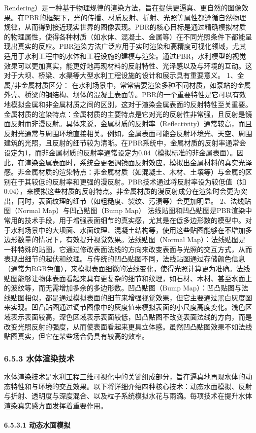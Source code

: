 Rendering）是一种基于物理规律的渲染方法，旨在提供更逼真、更自然的图像效果。在PBR的框架下，光的传播、材质反射、折射、光照等属性都遵循自然物理规律，从而得到接近现实世界的图像表现。PBR的核心目标是通过精确模拟材质的物理属性，使得各种材质（如水体、混凝土、金属等）在不同光照条件下都能呈现出真实的反应。PBR渲染方法广泛应用于实时渲染和高精度可视化领域，尤其适用于水利工程中的水体和工程设施的建模与渲染。通过PBR，水利模型的视觉效果可以更加真实，能更好地再现材料的反射特性、光泽感以及与环境的互动。这对于大坝、桥梁、水渠等大型水利工程设施的设计和展示具有重要意义。 1、金属/非金属材质区分： 在水利场景中，常常需要渲染多种不同材质，如泵站的金属外壳、桥梁的钢结构、坝体的混凝土表面等。PBR的一个重要特性是它可以有效地模拟金属和非金属材质之间的区别，这对于渲染金属表面的反射特性至关重要。金属材质的渲染特点：金属材质的主要特点是它对光的反射性非常强，且反射是镜面反射而非漫反射。具体来说，金属材质的反射率（Reflectivity）通常较高，而且反射光通常与周围环境直接相关。例如，金属表面可能会反射环境光、天空、周围建筑的光照，且反射的细节较为清晰。在PBR系统中，金属材质的反射率通常会设定为1，而非金属材质的反射率通常设定为0.04（模拟标准的非金属表面）。因此，在渲染金属表面时，系统会更强调镜面反射效应，模拟出金属材料的真实光泽感。非金属材质的渲染特点：非金属材质（如混凝土、木材、土壤等）与金属的区别在于其较低的反射率和更强的漫反射。PBR技术通过将反射率设为较低值（如0.04），来模拟这些材质的反射特点。非金属材质的漫反射成分在渲染时会更为突出，同时，表面纹理的细节（如粗糙度、裂纹、污渍等）会更加明显。 2、法线贴图（Normal Map）与凹凸贴图（Bump Map） 法线贴图和凹凸贴图是PBR渲染中常用的技术手段，用于增强表面细节的真实感，尤其是在低多边形数的模型中。对于水利场景中的大坝面、水面纹理、混凝土结构等，使用这些贴图能够在不增加多边形数量的情况下，有效提升视觉效果。法线贴图（Normal Map）：法线贴图是一种特殊的贴图，它通过修改表面法线的方向来改变表面与光照的交互方式，从而表现出细节的起伏和纹理。与传统的凹凸贴图不同，法线贴图通过存储颜色信息（通常为RGB色值），来模拟表面细微的法线变化，使得光照计算更为准确。法线贴图能够让物体表面看起来具有更复杂的细节和纹理，如石材、木材、甚至水面上的波纹等，而无需增加多余的多边形数。凹凸贴图（Bump Map）：凹凸贴图与法线贴图相似，都是通过模拟表面的细节来增强视觉效果，但它主要通过黑白灰度图来实现。凹凸贴图通过调节图像中的灰度值来模拟表面的小尺度高度变化。浅色区域表示表面较高，深色区域表示表面较低，凹凸贴图不改变表面法线的方向，而是改变光照反射的强度，从而使表面看起来更具立体感。虽然凹凸贴图效果不如法线贴图真实，但它在某些场合仍具有较高的效率。 \subsubsection{6.5.3 水体渲染技术}\label{ux6c34ux4f53ux6e32ux67d3ux6280ux672f} 水体渲染技术是水利工程三维可视化中的关键组成部分，旨在逼真地再现水体的动态特性和与环境的交互效果。以下将详细介绍四种核心技术：动态水面模拟、反射与折射、透明度与深度混合、以及粒子系统模拟水花与雨滴。每项技术在提升水体渲染真实感方面发挥着重要作用。 \paragraph{6.5.3.1 动态水面模拟}\label{ux52a8ux6001ux6c34ux9762ux6a21ux62df} 